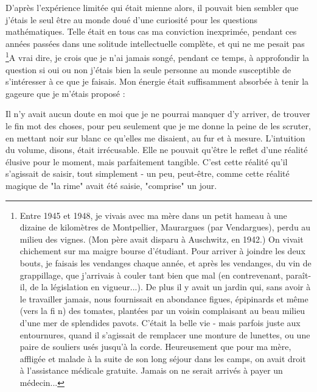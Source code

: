 D’après l’expérience limitée qui était mienne alors, il pouvait bien sembler que j’étais le seul être au monde doué d’une curiosité pour les questions mathématiques. Telle était en tous cas ma conviction inexprimée, pendant ces années passées dans une solitude intellectuelle complète, et qui ne me pesait pas \footnote{Entre 1945 et 1948, je vivais avec ma mère dans un petit hameau à une dizaine de kilomètres de Montpellier, Maurargues (par Vendargues), perdu au milieu des vignes. (Mon père avait disparu à Auschwitz, en 1942.) On vivait chichement sur ma maigre bourse d’étudiant. Pour arriver à joindre les deux bouts, je faisais les vendanges chaque année, et après les vendanges, du vin de grappillage, que j’arrivais à couler tant bien que mal (en contrevenant, paraît-il, de la législation en vigueur...). De plus il y avait un jardin qui, sans avoir à le travailler jamais, nous fournissait en abondance figues, épipinards et même (vers la fi n) des tomates, plantées par un voisin complaisant au beau milieu d’une mer de splendides pavots. C’était la belle vie - mais parfois juste aux entournures, quand il s’agissait de remplacer une monture de lunettes, ou une paire de souliers usés jusqu’à la corde. Heureusement que pour ma mère, affligée et malade à la suite de son long séjour dans les camps, on avait droit à l’assistance médicale gratuite. Jamais on ne serait arrivés à payer un médecin...}A vrai dire, je crois que je n’ai jamais songé, pendant ce temps, à approfondir la question si oui ou non j’étais bien la seule personne au monde susceptible de s’intéresser à ce que je faisais. Mon énergie était suffisamment absorbée à tenir la gageure que je m’étais proposé : 

Il n’y avait aucun doute en moi que je ne pourrai manquer d’y arriver, de trouver le fin mot des choses, pour peu seulement que je me donne la peine de les scruter, en mettant noir sur blanc ce qu’elles me disaient, au fur et à mesure. L’intuition du volume, disons, était irrécusable. Elle ne pouvait qu’être le reflet d’une réalité élusive pour le moment, mais parfaitement tangible. C’est cette réalité qu’il s’agissait de saisir, tout simplement - un peu, peut-être, comme cette réalité magique de "la rime" avait été saisie, "comprise" un jour.


